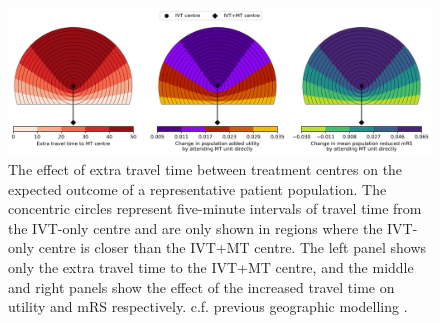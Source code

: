 \begin{figure}
    \centering
    \includegraphics[width=\columnwidth]{images/circle_plots.jpg}
    \caption{
        The effect of extra travel time between treatment centres on the expected outcome of a representative patient population.
        The concentric circles represent five-minute intervals  of travel time from the IVT-only centre
        and are only shown in regions where the IVT-only centre is closer than the IVT+MT centre. 
        The left panel shows only the extra travel time to the IVT+MT centre, and the middle and right panels show the effect of the increased travel time on utility and mRS respectively. 
        c.f. previous geographic modelling  \cite{holodinsky_modeling_2018}. 
        }
    \label{fig:circles}
\end{figure}
